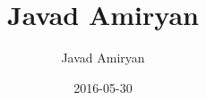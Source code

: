 \documentclass[10pt]{res}
\title{Javad Amiryan}
\author{Javad Amiryan}
\date{2016-05-30}
\begin{document}
\vspace{28pt}


\address{{\bf Address} \\ No. 18, Beheshti Alley, Bagh-e-Abrisham \\ Kermanshah, Iran\\Postal Code: 67148 - 63876} %


\address{{\bf Contact} \\ 
Mobile: (+98) 918-856-2694 \\
Email: amiryanj@ce.sharif.edu \\
Web: \url{http://ce.sharif.edu/\~amiryanj} } %
\end{document}
